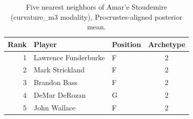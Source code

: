 \begin{table}[htbp]
  \centering\small
  \begin{tabular}{rllc}
    \toprule
    Rank & Player & Position & Archetype \\
    \midrule
    1 & Lawrence Funderburke & F & 2 \\
    2 & Mark Strickland & F & 2 \\
    3 & Brandon Bass & F & 2 \\
    4 & DeMar DeRozan & G & 2 \\
    5 & John Wallace & F & 2 \\
    \bottomrule
  \end{tabular}
  \caption{Five nearest neighbors of Amar'e Stoudemire (curvature_m3 modality), Procrustes-aligned posterior mean.}
  \label{tab:Amar_e_Stoudemire_neighbors_curvature_m3}
\end{table}

